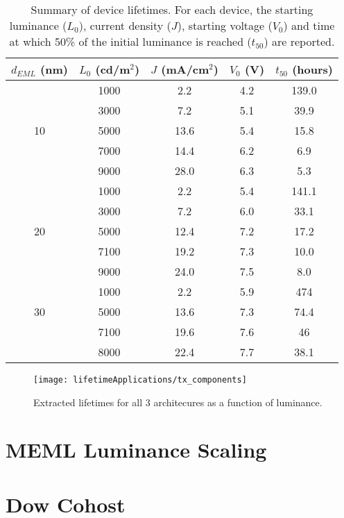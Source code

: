 \documentclass[../thesis.tex]{subfiles}
\begin{document}
\begin{table}[h]
\centering
\begin{tabular}{c|c|c|c|c}
$d_{EML}$ (nm) & $L_0$ (cd/m$^2$) & $J$ (mA/cm$^2$) & $V_0$ (V) & $t_{50}$ (hours) \\
\hline
& 1000 & 2.2 & 4.2 & 139.0 \\
& 3000 & 7.2 & 5.1 & 39.9 \\
10 & 5000 & 13.6 & 5.4 & 15.8 \\
& 7000 & 14.4 & 6.2 & 6.9 \\
& 9000 & 28.0 &  6.3 & 5.3 \\
\hline
& 1000 & 2.2 & 5.4 & 141.1 \\
& 3000 & 7.2 & 6.0 & 33.1 \\
20 & 5000 & 12.4 & 7.2 & 17.2 \\
& 7100 & 19.2 & 7.3 & 10.0 \\
& 9000 & 24.0 &  7.5 & 8.0 \\
\hline
& 1000 & 2.2 & 5.9 & 474 \\
30 & 5000 & 13.6 & 7.3 & 74.4\\
& 7100 & 19.6 & 7.6 & 46 \\
& 8000 & 22.4 &  7.7 & 38.1 \\

\end{tabular}
\caption{Summary of device lifetimes.  For each device, the starting luminance ($L_0$), current density ($J$), starting voltage ($V_0$) and time at which 50\% of the initial luminance is reached ($t_{50}$) are reported.}
\label{tab:lifetime_summary}
\end{table}

\begin{figure}[ht]
\centering
\texttt{[image: lifetimeApplications/tx\_components]}
\caption{Extracted lifetimes for all 3 architecures as a function of luminance.}
\label{fig:tx_components}
\end{figure}

\section{MEML Luminance Scaling}


\section{Dow Cohost}



\end{document}
